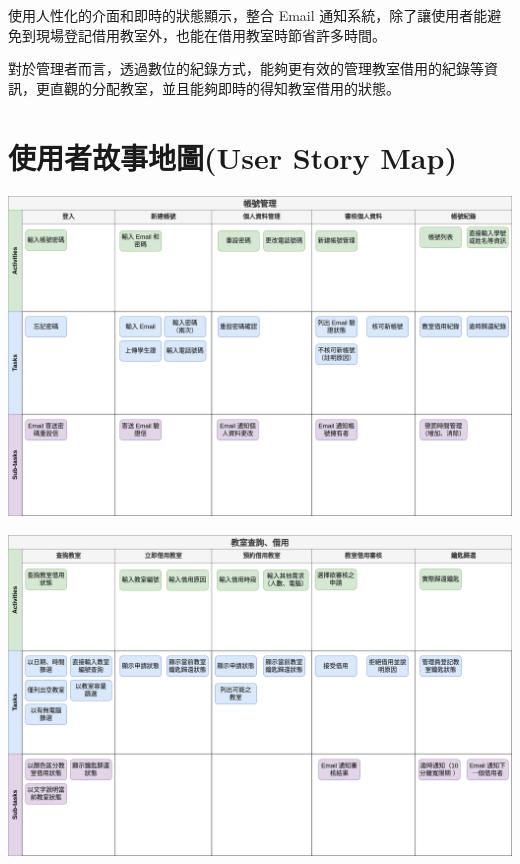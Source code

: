 \documentclass{article}
\begin{document}
使用人性化的介面和即時的狀態顯示，整合 Email 通知系統，除了讓使用者能避免到現場登記借用教室外，也能在借用教室時節省許多時間。

\bigskip

對於管理者而言，透過數位的紀錄方式，能夠更有效的管理教室借用的紀錄等資訊，更直觀的分配教室，並且能夠即時的得知教室借用的狀態。

\newpage

\section[使用者故事地圖(USER STORY MAP)]{使用者故事地圖(User Story Map)}

\begin{center}
	\includegraphics[height=0.45\textheight]{UserStoryMap-AccountManagement.png}
\end{center}

\begin{center}
	\includegraphics[height=0.45\textheight]{UserStoryMap-ClassroomBorrowing.png}
\end{center}
\newpage
\end{document}
